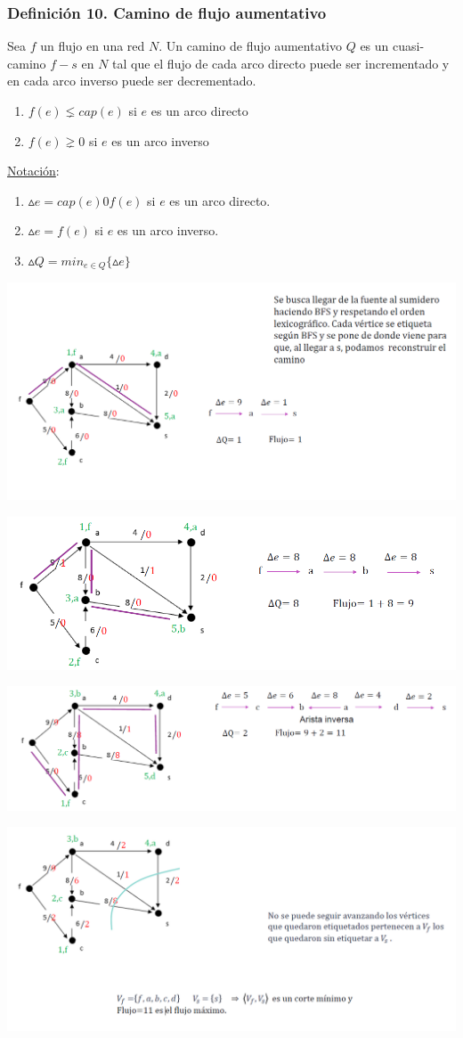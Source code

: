\documentclass{article}
\begin{document}
\subsubsection*{Definición 10. Camino de flujo aumentativo}
Sea $f$ un flujo en una red $N$. Un camino de flujo aumentativo $Q$ es un 
cuasi-camino $f-s$ en $N$ tal que el flujo de cada arco directo puede ser incrementado
y en cada arco inverso puede ser decrementado.
\begin{enumerate}
    \item $f(e) \lneq cap(e)$ si $e$ es un arco directo
    \item $f(e) \gneq 0$ si $e$ es un arco inverso
\end{enumerate}
\underline{Notación}:
\begin{enumerate}
    \item $\vartriangle e = cap(e) 0 f(e)$ si $e$ es un arco directo.
    \item $\vartriangle e = f(e)$ si $e$ es un arco inverso.
    \item $\vartriangle Q = min_{e \in Q}\{ \vartriangle e \}$
\end{enumerate}
\begin{center}
    \includegraphics[width=.60\textwidth]{caminoFlujoAumentativo.PNG}
\end{center}
\begin{center}
    \includegraphics[width=.60\textwidth]{caminoFlujoAumentativo2.PNG}
\end{center}
\begin{center}
    \includegraphics[width=.60\textwidth]{caminoFlujoAumentativo3.PNG}
\end{center}
\begin{center}
    \includegraphics[width=.60\textwidth]{caminoFlujoAumentativo4.PNG}
\end{center}
\end{document}
